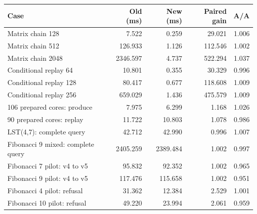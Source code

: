 \begin{center}
\small
\begin{tabular}{lrrrr}
\toprule
Case & Old (ms) & New (ms) & Paired gain & A/A \\
\midrule
Matrix chain 128 & 7.522 & 0.259 & 29.021 & 1.006 \\
Matrix chain 512 & 126.933 & 1.126 & 112.546 & 1.002 \\
Matrix chain 2048 & 2346.597 & 4.737 & 522.294 & 1.037 \\
Conditional replay 64 & 10.801 & 0.355 & 30.329 & 0.996 \\
Conditional replay 128 & 80.417 & 0.677 & 118.608 & 1.009 \\
Conditional replay 256 & 659.029 & 1.436 & 475.579 & 1.009 \\
106 prepared cores: produce & 7.975 & 6.299 & 1.168 & 1.026 \\
90 prepared cores: replay & 11.722 & 10.803 & 1.078 & 0.986 \\
LST(4,7): complete query & 42.712 & 42.990 & 0.996 & 1.007 \\
Fibonacci 9 mixed: complete query & 2405.259 & 2389.484 & 1.002 & 0.997 \\
Fibonacci 7 pilot: v4 to v5 & 95.832 & 92.352 & 1.002 & 0.965 \\
Fibonacci 9 pilot: v4 to v5 & 117.476 & 115.658 & 1.002 & 0.951 \\
Fibonacci 4 pilot: refusal & 31.362 & 12.384 & 2.529 & 1.001 \\
Fibonacci 10 pilot: refusal & 49.220 & 23.994 & 2.061 & 0.959 \\
\bottomrule
\end{tabular}
\end{center}
